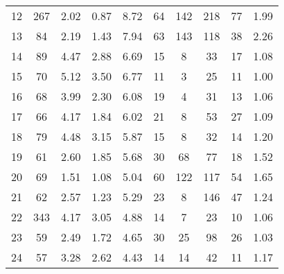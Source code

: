 \begin{tabular}{lccccccccc}
12 &      267 &           2.02 &           0.87 &          8.72 &              64 &             142 &                   218 &                       77 &       1.99 \\
13 &       84 &           2.19 &           1.43 &          7.94 &              63 &             143 &                   118 &                       38 &       2.26 \\
14 &       89 &           4.47 &           2.88 &          6.69 &              15 &               8 &                    33 &                       17 &       1.08 \\
15 &       70 &           5.12 &           3.50 &          6.77 &              11 &               3 &                    25 &                       11 &       1.00 \\
16 &       68 &           3.99 &           2.30 &          6.08 &              19 &               4 &                    31 &                       13 &       1.06 \\
17 &       66 &           4.17 &           1.84 &          6.02 &              21 &               8 &                    53 &                       27 &       1.09 \\
18 &       79 &           4.48 &           3.15 &          5.87 &              15 &               8 &                    32 &                       14 &       1.20 \\
19 &       61 &           2.60 &           1.85 &          5.68 &              30 &              68 &                    77 &                       18 &       1.52 \\
20 &       69 &           1.51 &           1.08 &          5.04 &              60 &             122 &                   117 &                       54 &       1.65 \\
21 &       62 &           2.57 &           1.23 &          5.29 &              23 &               8 &                   146 &                       47 &       1.24 \\
22 &      343 &           4.17 &           3.05 &          4.88 &              14 &               7 &                    23 &                       10 &       1.06 \\
23 &       59 &           2.49 &           1.72 &          4.65 &              30 &              25 &                    98 &                       26 &       1.03 \\
24 &       57 &           3.28 &           2.62 &          4.43 &              14 &              14 &                    42 &                       11 &       1.17 \\

\end{tabular}

